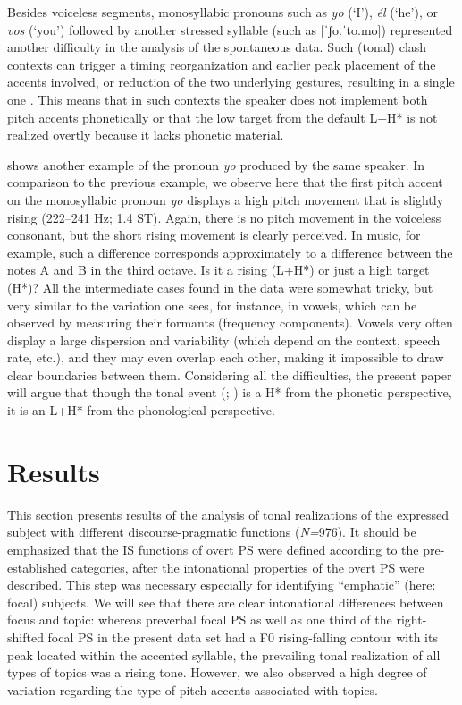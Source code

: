 \documentclass[output=paper]{langsci/langscibook}
\begin{document}
Besides voiceless segments, monosyllabic pronouns such as \textit{yo} (‘I’), \textit{él} (‘he’), or \textit{vos} (‘you’) followed by another stressed syllable (such as [ˈʃo.ˈto.mo]) represented another difficulty in the analysis of the spontaneous data. Such (tonal) clash contexts can trigger a timing reorganization and earlier peak placement of the accents involved, or reduction of the two underlying gestures, resulting in a single one \citep{Prieto1995}. This means that in such contexts the speaker does not implement both pitch accents phonetically or that the low target from the default L+H* is not realized overtly because it lacks phonetic material.





 shows another example of the pronoun \textit{yo} produced by the same speaker. In comparison to the previous example, we observe here that the first pitch accent on the monosyllabic pronoun \textit{yo} displays a high pitch movement that is slightly rising (222–241 Hz; 1.4 ST). Again, there is no pitch movement in the voiceless consonant, but the short rising movement is clearly perceived. In music, for example, such a difference corresponds approximately to a difference between the notes A and B in the third octave. Is it a rising (L+H*) or just a high target (H*)? All the intermediate cases found in the data were somewhat tricky, but very similar to the variation one sees, for instance, in vowels, which can be observed by measuring their formants (frequency components). Vowels very often display a large dispersion and variability (which depend on the context, speech rate, etc.), and they may even overlap each other, making it impossible to draw clear boundaries between them. Considering all the difficulties, the present paper will argue that though the tonal event (; ) is a H* from the phonetic perspective, it is an L+H* from the phonological perspective.

\section{Results}
\label{sec:pes:4}
This section presents results of the analysis of tonal realizations of the expressed subject with different discourse-pragmatic functions (\textit{N=}976). It should be emphasized that the IS functions of overt PS were defined according to the pre-established categories, after the intonational properties of the overt PS were described. This step was necessary especially for identifying ``emphatic'' (here: focal) subjects. We will see that there are clear intonational differences between focus and topic: whereas preverbal focal PS as well as one third of the right-shifted focal PS in the present data set had a F0 rising-falling contour with its peak located within the accented syllable, the prevailing tonal realization of all types of topics was a rising tone. However, we also observed a high degree of variation regarding the type of pitch accents associated with topics.
\end{document}
